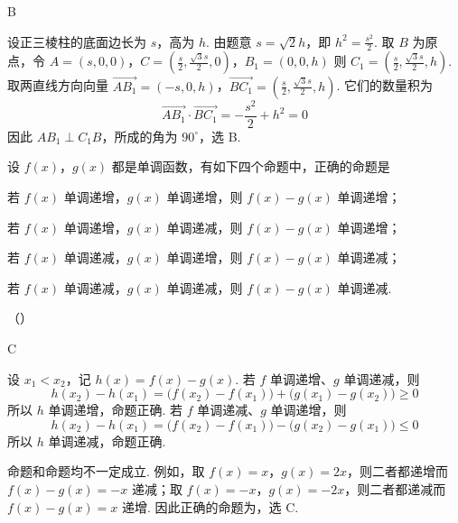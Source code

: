 \begin{answer}
B
\end{answer}

\begin{solution}
设正三棱柱的底面边长为 \(s\)，高为 \(h\). 由题意 \(s=\sqrt2h\)，即 \(h^2=\frac{s^2}{2}\). 取 \(B\) 为原点，令
\(A=(s,0,0)\)，\(C=\left(\frac s2,\frac{\sqrt3s}{2},0\right)\)，\(B_1=(0,0,h)\)
则 \(C_1=\left(\frac s2,\frac{\sqrt3s}{2},h\right)\). 取两直线方向向量
\(\overrightarrow{AB_1}=(-s,0,h)\)，\(\overrightarrow{BC_1}=\left(\frac s2,\frac{\sqrt3s}{2},h\right)\).
它们的数量积为
\[
\overrightarrow{AB_1}\cdot\overrightarrow{BC_1}=-\frac{s^2}{2}+h^2=0
\]
因此 \(AB_1\perp C_1B\)，所成的角为 \(90^{\circ}\)，选 B.
\end{solution}

\begin{problem}
设 \(f(x)\)，\(g(x)\) 都是单调函数，有如下四个命题中，正确的命题是

\begin{circlelist}
\item 若 \( f(x) \) 单调递增，\( g(x) \) 单调递增，则 \( f(x) - g(x) \) 单调递增；
\item 若 \( f(x) \) 单调递增，\( g(x) \) 单调递减，则 \( f(x)-g(x) \) 单调递增；
\item 若 \( f(x) \) 单调递减，\( g(x) \) 单调递增，则 \( f(x)-g(x) \) 单调递减；
\item 若 \( f(x) \) 单调递减，\( g(x) \) 单调递减，则 \( f(x)-g(x) \) 单调递减.
\end{circlelist}

（\quad）

\choices
    {}
    {}
    {}
    {}
\end{problem}

\begin{answer}
C
\end{answer}

\begin{solution}
设 \(x_1<x_2\)，记 \(h(x)=f(x)-g(x)\). 若 \(f\) 单调递增、\(g\) 单调递减，则
\[
h(x_2)-h(x_1)=\bigl(f(x_2)-f(x_1)\bigr)+\bigl(g(x_1)-g(x_2)\bigr)\geqslant0
\]
所以 \(h\) 单调递增，命题正确. 若 \(f\) 单调递减、\(g\) 单调递增，则
\[
h(x_2)-h(x_1)=\bigl(f(x_2)-f(x_1)\bigr)-\bigl(g(x_2)-g(x_1)\bigr)\leqslant0
\]
所以 \(h\) 单调递减，命题正确.

命题和命题均不一定成立. 例如，取 \(f(x)=x\)，\(g(x)=2x\)，则二者都递增而 \(f(x)-g(x)=-x\) 递减；取 \(f(x)=-x\)，\(g(x)=-2x\)，则二者都递减而 \(f(x)-g(x)=x\) 递增. 因此正确的命题为，选 C.
\end{solution}

